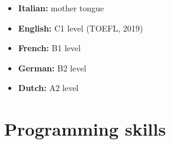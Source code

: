 \documentclass[10pt, a4paper, roman]{moderncv}        %
\begin{document}
	\begin{itemize}
		
		\item \textbf{Italian:} mother tongue
		
		\vspace{1pt}
		
		\item \textbf{English:} C1 level (TOEFL, 2019)
		
		\vspace{1pt}
		
		\item \textbf{French:} B1 level
		
		\vspace{1pt}
		
		\item \textbf{German:} B2 level
		
		\vspace{1pt}
		
		\item \textbf{Dutch:} A2 level
		
	\end{itemize}
	
	\vspace{2pt}
	
	\section{Programming skills}
	
	\vspace{1pt}
	
\end{document}
